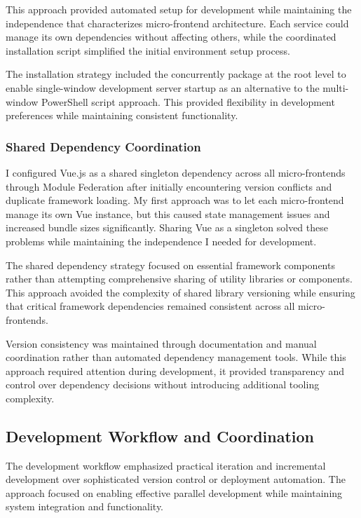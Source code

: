 \documentclass[12pt,a4paper]{report}
\begin{document}
This approach provided automated setup for development while maintaining the independence that characterizes micro-frontend architecture. Each service could manage its own dependencies without affecting others, while the coordinated installation script simplified the initial environment setup process.

The installation strategy included the concurrently package at the root level to enable single-window development server startup as an alternative to the multi-window PowerShell script approach. This provided flexibility in development preferences while maintaining consistent functionality.

\subsubsection{Shared Dependency Coordination}

I configured Vue.js as a shared singleton dependency across all micro-frontends through Module Federation after initially encountering version conflicts and duplicate framework loading. My first approach was to let each micro-frontend manage its own Vue instance, but this caused state management issues and increased bundle sizes significantly. Sharing Vue as a singleton solved these problems while maintaining the independence I needed for development.

The shared dependency strategy focused on essential framework components rather than attempting comprehensive sharing of utility libraries or components. This approach avoided the complexity of shared library versioning while ensuring that critical framework dependencies remained consistent across all micro-frontends.

Version consistency was maintained through documentation and manual coordination rather than automated dependency management tools. While this approach required attention during development, it provided transparency and control over dependency decisions without introducing additional tooling complexity.

\subsection{Development Workflow and Coordination}

The development workflow emphasized practical iteration and incremental development over sophisticated version control or deployment automation. The approach focused on enabling effective parallel development while maintaining system integration and functionality.
\end{document}
